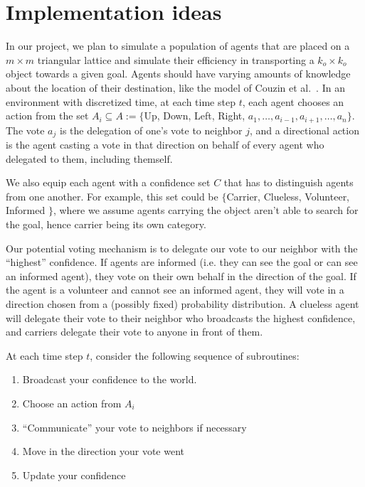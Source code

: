 \documentclass[12pt]{article}
\begin{document}
\section{Implementation ideas}
In our project, we plan to simulate a population of agents that are placed on a $m \times m$ triangular lattice and simulate their efficiency in transporting a $k_o \times k_o$ object towards a given goal.
Agents should have varying amounts of knowledge about the location of their destination, like the model of Couzin et al.~\cite{couzin2005effective}.
In an environment with discretized time, at each time step $t$, each agent chooses an action from the set $A_i \subseteq A := \{$Up, Down, Left, Right, $a_1, \ldots, a_{i-1}, a_{i+1}, \ldots, a_n \}$.
The vote $a_j$ is the delegation of one's vote to neighbor $j$, and a directional action is the agent casting a vote in that direction on behalf of every agent who delegated to them, including themself.

We also equip each agent with a confidence set $C$ that has to distinguish agents from one another.
For example, this set could be $\{$Carrier, Clueless, Volunteer, Informed $\}$, where we assume agents carrying the object aren't able to search for the goal, hence carrier being its own category.

Our potential voting mechanism is to delegate our vote to our neighbor with the ``highest'' confidence.
If agents are informed (i.e. they can see the goal or can see an informed agent), they vote on their own behalf in the direction of the goal.
If the agent is a volunteer and cannot see an informed agent, they will vote in a direction chosen from a (possibly  fixed) probability distribution.
A clueless agent will delegate their vote to their neighbor who broadcasts the highest confidence, and carriers delegate their vote to anyone in front of them.

At each time step $t$, consider the following sequence of subroutines:
\begin{enumerate}
	\item Broadcast your confidence to the world.
	\item Choose an action from $A_i$
	\item ``Communicate'' your vote to neighbors if necessary
	\item Move in the direction your vote went
	\item Update your confidence
\end{enumerate}
\end{document}
